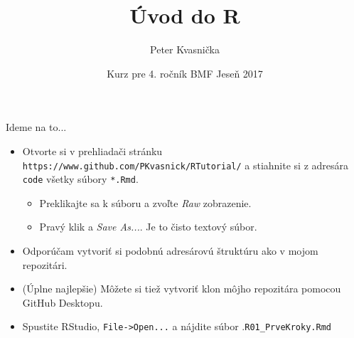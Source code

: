 \documentclass[9pt]{beamer}
\author{Peter Kvasnička}
\title{Úvod do R}
\institute{Univerzita Karlova, Praha}
\date{Kurz pre 4. ročník BMF \newline Jeseň 2017}
\begin{document}
\begin{frame}
\titlepage
\end{frame}

\clearpage  \clearpage
\clearpage  \clearpage

\begin{frame}{Ideme na to...}
	\begin{itemize}
		\item Otvorte si v prehliadači stránku \texttt{https://www.github.com/PKvasnick/RTutorial/} a stiahnite si z adresára \texttt{code} všetky súbory \texttt{*.Rmd}.
		\begin{itemize}
			\item Preklikajte sa k súboru a zvoľte \emph{Raw} zobrazenie.
			\item Pravý klik a \emph{Save As...}. Je to čisto textový súbor.
		\end{itemize}
		\item Odporúčam vytvoriť si podobnú adresárovú štruktúru ako v mojom repozitári.
		\item (Úplne najlepšie) Môžete si tiež vytvoriť klon môjho repozitára pomocou GitHub Desktopu.
		\item Spustite RStudio, \texttt{File->Open...} a nájdite súbor .\texttt{R01\_PrveKroky.Rmd}
	\end{itemize}
\end{frame}
\end{document}
